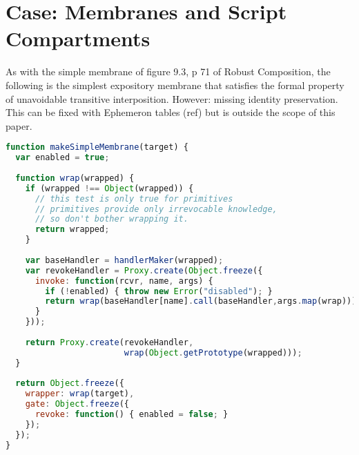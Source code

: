 \documentclass{acm_proc_article-sp}
\begin{document}
%
%
%
%

\section{Case: Membranes and Script Compartments}

As with the simple membrane of figure 9.3, p 71 of Robust Composition, the following is the simplest expository membrane that satisfies the formal property of unavoidable transitive interposition.
However: missing identity preservation. This can be fixed with Ephemeron tables (ref) but is outside the scope of this paper.

\begin{lstlisting}[language=javascript]
function makeSimpleMembrane(target) {
  var enabled = true;
  
  function wrap(wrapped) {
    if (wrapped !== Object(wrapped)) {
      // this test is only true for primitives
      // primitives provide only irrevocable knowledge,
      // so don't bother wrapping it.
      return wrapped;
    }
 
    var baseHandler = handlerMaker(wrapped);
    var revokeHandler = Proxy.create(Object.freeze({
      invoke: function(rcvr, name, args) {
        if (!enabled) { throw new Error("disabled"); }
        return wrap(baseHandler[name].call(baseHandler,args.map(wrap)));
      }
    }));
          
    return Proxy.create(revokeHandler, 
                        wrap(Object.getPrototype(wrapped)));
  }
    
  return Object.freeze({
    wrapper: wrap(target),
    gate: Object.freeze({
      revoke: function() { enabled = false; }
    });
  });
}
\end{lstlisting}
\end{document}
